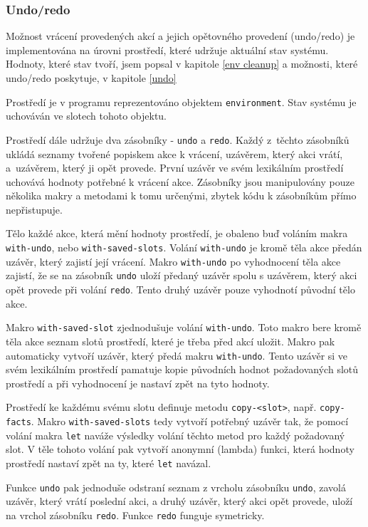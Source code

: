\subsubsection{Undo/redo}

Možnost vrácení provedených akcí a jejich opětovného provedení (undo/redo) je
implementována na úrovni prostředí, které udržuje aktuální stav systému.
Hodnoty, které stav tvoří, jsem popsal v kapitole \ref{env cleanup} a možnosti,
které undo/redo poskytuje, v kapitole \ref{undo}

Prostředí je v programu reprezentováno objektem \verb|environment|. Stav
systému je uchováván ve slotech tohoto objektu.

Prostředí dále udržuje dva zásobníky - \verb|undo| a \verb|redo|.
Každý z~těchto zásobníků ukládá seznamy tvořené popiskem akce k vrácení,
uzávěrem, který akci vrátí, a~uzávěrem, který ji opět provede. První uzávěr ve
svém lexikálním prostředí uchovává hodnoty potřebné k vrácení akce. Zásobníky
jsou manipulovány pouze několika makry a metodami k tomu určenými, zbytek kódu k
zásobníkům přímo nepřistupuje.

Tělo každé akce, která mění hodnoty prostředí, je obaleno buď voláním makra
\verb|with-undo|, nebo \verb|with-saved-slots|. Volání \verb|with-undo| je kromě
těla akce předán uzávěr, který zajistí její vrácení. Makro \verb|with-undo|
po vyhodnocení těla akce zajistí, že se na zásobník \verb|undo| uloží předaný
uzávěr spolu s uzávěrem, který akci opět provede při volání \verb|redo|.
Tento druhý uzávěr pouze vyhodnotí původní tělo akce.

Makro \verb|with-saved-slot| zjednodušuje volání \verb|with-undo|. Toto makro
bere kromě těla akce seznam slotů prostředí, které je třeba před akcí uložit.
Makro pak automaticky vytvoří uzávěr, který předá makru \verb|with-undo|. Tento
uzávěr si ve svém lexikálním prostředí pamatuje kopie původních hodnot požadovaných
slotů prostředí a při vyhodnocení je nastaví zpět na tyto hodnoty.

Prostředí ke každému svému slotu definuje metodu \verb|copy-<slot>|, např.
\verb|copy-facts|. Makro \verb|with-saved-slots| tedy vytvoří potřebný uzávěr
tak, že pomocí volání makra \verb|let| naváže výsledky volání těchto metod pro
každý požadovaný slot. V těle tohoto volání pak vytvoří anonymní (lambda)
funkci, která hodnoty prostředí nastaví zpět na ty, které \verb|let| navázal.

Funkce \verb|undo| pak jednoduše odstraní seznam z vrcholu zásobníku
\verb|undo|, zavolá uzávěr, který vrátí poslední akci, a druhý uzávěr, který akci
opět provede, uloží na vrchol zásobníku \verb|redo|. Funkce \verb|redo| funguje
symetricky.

